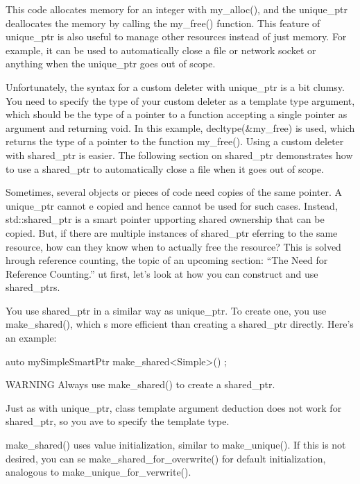 This code allocates memory for an integer with my\_alloc(), and the unique\_ptr deallocates the memory by calling the my\_free() function. This feature of unique\_ptr is also useful to manage other resources instead of just memory. For example, it can be used to automatically close a file or network socket or anything when the unique\_ptr goes out of scope.

Unfortunately, the syntax for a custom deleter with unique\_ptr is a bit clumsy. You need to specify the type of your custom deleter as a template type argument, which should be the type of a pointer to a function accepting a single pointer as argument and returning void. In this example, decltype(\&my\_free) is used, which returns the type of a pointer to the function my\_free(). Using a custom deleter with shared\_ptr is easier. The following section on shared\_ptr demonstrates how to use a shared\_ptr to automatically close a file when it goes out of scope.


Sometimes, several objects or pieces of code need copies of the same pointer. A unique\_ptr cannot e copied and hence cannot be used for such cases. Instead, std::shared\_ptr is a smart pointer upporting shared ownership that can be copied. But, if there are multiple instances of shared\_ptr eferring to the same resource, how can they know when to actually free the resource? This is solved hrough reference counting, the topic of an upcoming section: “The Need for Reference Counting.” ut first, let’s look at how you can construct and use shared\_ptrs.


You use shared\_ptr in a similar way as unique\_ptr. To create one, you use make\_shared(), which s more efficient than creating a shared\_ptr directly. Here’s an example:

\begin{cpp}
auto mySimpleSmartPtr { make_shared<Simple>() };
\end{cpp}

\begin{myWarning}{WARNING}
Always use make\_shared() to create a shared\_ptr.
\end{myWarning}

Just as with unique\_ptr, class template argument deduction does not work for shared\_ptr, so you ave to specify the template type.

make\_shared() uses value initialization, similar to make\_unique(). If this is not desired, you can se make\_shared\_for\_overwrite() for default initialization, analogous to make\_unique\_for\_verwrite().

